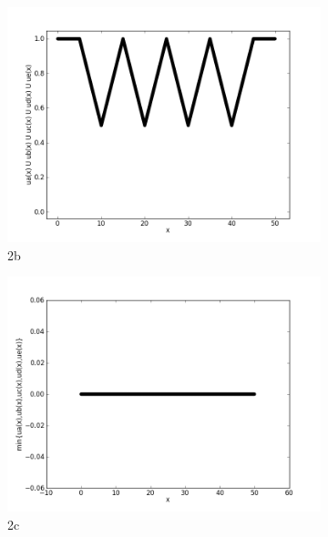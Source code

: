 \documentclass{report}
\begin{document}
\begin{figure}[ht]
        \begin{subfigure}[b]{0.5\textwidth}
                \centering
                \includegraphics[width=\textwidth]{ex2b.png}
                \caption{2b}
        \end{subfigure}
	\begin{subfigure}[b]{0.5\textwidth}
                \centering
                \includegraphics[width=\textwidth]{ex2c.png}
                \caption{2c}
	\end{subfigure}
	\begin{subfigure}[b]{0.5\textwidth}
                \centering

\end{subfigure}
\end{figure}
\end{document}
